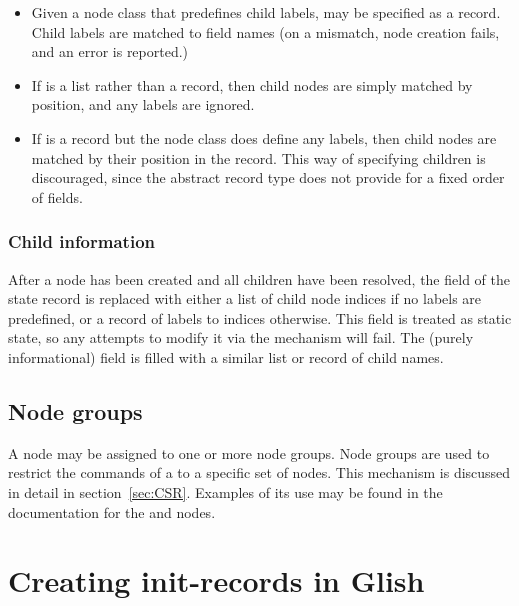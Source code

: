   \begin{itemize}
  
  \item Given a node class that predefines child labels,  may be
  specified as a record. Child labels are matched to field names (on a
  mismatch, node creation fails, and an error is reported.)

  \item If  is a list rather than a record, then child nodes are
  simply matched by position, and any labels are ignored.
  
  \item If  is a record but the node class does define any 
  labels, then child nodes are matched by their position in the record. This
  way of specifying children is discouraged, since the abstract record type
  does not provide for a fixed order of fields.

  \end{itemize}  
  
\subsubsection{Child information}
  
  After a node has been created and all children have been resolved, the
   field of the state record is replaced with either a list of
  child node indices if no labels are predefined, or a record of
  labels to indices otherwise. This field is treated as static state,
  so any attempts to modify it via the  mechanism will fail. The
  (purely informational)  field is filled with a similar
  list or record of child names. 

\subsection{Node groups}

  A node may be assigned to one or more node groups. Node groups are used to
  restrict the commands of a \Request to a specific set of nodes. This
  mechanism is discussed in detail in section~\ref{sec:CSR}. Examples of its
  use may be found in the documentation for the  and 
  nodes.

\section{Creating init-records in Glish}

